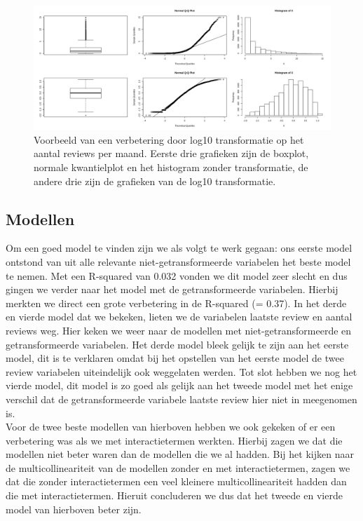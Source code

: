 \documentclass[a4paper,kulak]{kulakarticle} %
\begin{document}
\begin{figure}[H]
	\centering
	\includegraphics[width=\textwidth]{transformatieVb.jpeg}
	\caption{Voorbeeld van een verbetering door log10 transformatie op het aantal reviews per maand. Eerste drie grafieken zijn de boxplot, normale kwantielplot en het histogram zonder transformatie, de andere drie zijn de grafieken van de log10 transformatie.}
	\label{fig:transformVb}
\end{figure}

\subsection{Modellen}
Om een goed model te vinden zijn we als volgt te werk gegaan: ons eerste model ontstond van uit alle relevante niet-getransformeerde variabelen het beste model te nemen. Met een R-squared van 0.032 vonden we dit model zeer slecht en dus gingen we verder naar het model met de getransformeerde variabelen. Hierbij merkten we direct een grote verbetering in de R-squared (= 0.37). In het derde en vierde model dat we bekeken, lieten we de variabelen laatste review en aantal reviews weg. Hier keken we weer naar de modellen met niet-getransformeerde en getransformeerde variabelen. Het derde model bleek gelijk te zijn aan het eerste model, dit is te verklaren omdat bij het opstellen van het eerste model de twee review variabelen uiteindelijk ook weggelaten werden. Tot slot hebben we nog het vierde model, dit model is zo goed als gelijk aan het tweede model met het enige verschil dat de getransformeerde variabele laatste review hier niet in meegenomen is. \\

Voor de twee beste modellen van hierboven hebben we ook gekeken of er een verbetering was als we met interactietermen werkten. Hierbij zagen we dat die modellen niet beter waren dan de modellen die we al hadden. Bij het kijken naar de multicollineariteit van de modellen zonder en met interactietermen, zagen we dat die zonder interactietermen een veel kleinere multicollineariteit hadden dan die met interactietermen. Hieruit concluderen we dus dat het tweede en vierde model van hierboven beter zijn. \\
\end{document}
